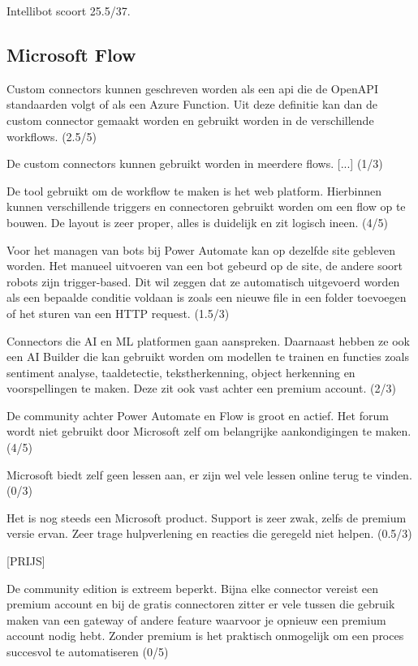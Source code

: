 Intellibot scoort 25.5/37.

\subsection{Microsoft Flow}

Custom connectors kunnen geschreven worden als een \acrshort{api} die de OpenAPI standaarden volgt of als een Azure Function. Uit deze definitie kan dan de custom connector gemaakt worden en gebruikt worden in de verschillende workflows. (2.5/5)

De custom connectors kunnen gebruikt worden in meerdere flows. [...] (1/3)

De tool gebruikt om de workflow te maken is het web platform. Hierbinnen kunnen verschillende triggers en connectoren gebruikt worden om een flow op te bouwen. De layout is zeer proper, alles is duidelijk en zit logisch ineen. (4/5)

Voor het managen van bots bij Power Automate kan op dezelfde site gebleven worden. Het manueel uitvoeren van een bot gebeurd op de site, de andere soort robots zijn trigger-based. Dit wil zeggen dat ze automatisch uitgevoerd worden als een bepaalde conditie voldaan is zoals een nieuwe file in een folder toevoegen of het sturen van een HTTP request. (1.5/3)

Connectors die AI en ML platformen gaan aanspreken. Daarnaast hebben ze ook een AI Builder die kan gebruikt worden om modellen te trainen en functies zoals sentiment analyse, taaldetectie, tekstherkenning, object herkenning en voorspellingen te maken. Deze zit ook vast achter een premium account. (2/3)

De community achter Power Automate en Flow is groot en actief. Het forum wordt niet gebruikt door Microsoft zelf om belangrijke aankondigingen te maken. (4/5)

Microsoft biedt zelf geen lessen aan, er zijn wel vele lessen online terug te vinden. (0/3)

Het is nog steeds een Microsoft product. Support is zeer zwak, zelfs de premium versie ervan. Zeer trage hulpverlening en reacties die geregeld niet helpen. (0.5/3)

[PRIJS]

De community edition is extreem beperkt. Bijna elke connector vereist een premium account en bij de gratis connectoren zitter er vele tussen die gebruik maken van een gateway of andere feature waarvoor je opnieuw een premium account nodig hebt. Zonder premium is het praktisch onmogelijk om een proces succesvol te automatiseren (0/5)

